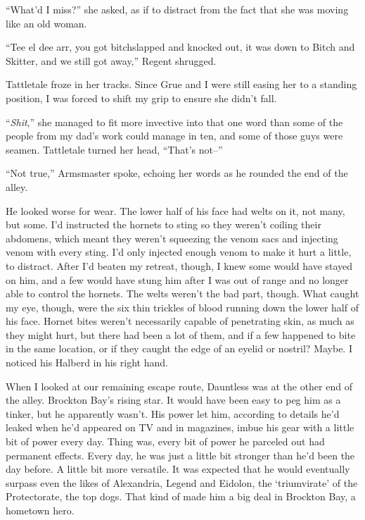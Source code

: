 ``What'd I miss?'' she asked, as if to distract from the fact that she was moving like an old woman.



``Tee el dee arr, you got bitchslapped and knocked out, it was down to Bitch and Skitter, and we still got away,'' Regent shrugged.



Tattletale froze in her tracks.  Since Grue and I were still easing her to a standing position, I was forced to shift my grip to ensure she didn't fall.



``\emph{Shit},'' she managed to fit more invective into that one word than some of the people from my dad's work could manage in ten, and some of those guys were seamen. Tattletale turned her head, ``That's not--''



``Not true,'' Armsmaster spoke, echoing her words as he rounded the end of the alley.



He looked worse for wear.  The lower half of his face had welts on it, not many, but some.  I'd instructed the hornets to sting so they weren't coiling their abdomens, which meant they weren't squeezing the venom sacs and injecting venom with every sting.  I'd only injected enough venom to make it hurt a little, to distract.  After I'd beaten my retreat, though, I knew some would have stayed on him, and a few would have stung him after I was out of range and no longer able to control the hornets.  The welts weren't the bad part, though.  What caught my eye, though, were the six thin trickles of blood running down the lower half of his face.  Hornet bites weren't necessarily capable of penetrating skin, as much as they might hurt, but there had been a lot of them, and if a few happened to bite in the same location, or if they caught the edge of an eyelid or nostril?  Maybe.  I noticed his Halberd in his right hand.



When I looked at our remaining escape route, Dauntless was at the other end of the alley.  Brockton Bay's rising star.  It would have been easy to peg him as a tinker, but he apparently wasn't.  His power let him, according to details he'd leaked when he'd appeared on TV and in magazines, imbue his gear with a little bit of power every day.  Thing was, every bit of power he parceled out had permanent effects.  Every day, he was just a little bit stronger than he'd been the day before.  A little bit more versatile.  It was expected that he would eventually surpass even the likes of Alexandria, Legend and Eidolon, the `triumvirate' of the Protectorate, the top dogs.  That kind of made him a big deal in Brockton Bay, a hometown hero.



